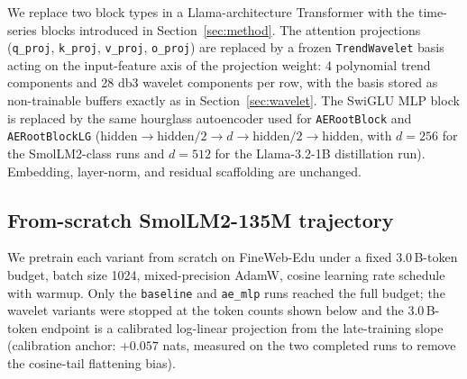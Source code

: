 \documentclass[11pt,a4paper]{article}
\begin{document}
We replace two block types in a Llama-architecture Transformer with the time-series blocks introduced in Section~\ref{sec:method}. The attention projections (\texttt{q\_proj}, \texttt{k\_proj}, \texttt{v\_proj}, \texttt{o\_proj}) are replaced by a frozen \texttt{TrendWavelet} basis acting on the input-feature axis of the projection weight: 4 polynomial trend components and 28 db3 wavelet components per row, with the basis stored as non-trainable buffers exactly as in Section~\ref{sec:wavelet}. The SwiGLU MLP block is replaced by the same hourglass autoencoder used for \texttt{AERootBlock} and \texttt{AERootBlockLG} ($\mathrm{hidden} \to \mathrm{hidden}/2 \to d \to \mathrm{hidden}/2 \to \mathrm{hidden}$, with $d=256$ for the SmolLM2-class runs and $d=512$ for the Llama-3.2-1B distillation run). Embedding, layer-norm, and residual scaffolding are unchanged.

\begin{table}[h]
  \caption{Parameter counts for the SmolLM2-135M-class port. The MLP block accounts for 59\% of the baseline parameter count and is the primary compression target. Total compression of the variants is roughly proportional to MLP-block compression.}
  \label{tab:llm_params}
  \centering
\end{table}

\subsection{From-scratch SmolLM2-135M trajectory}

We pretrain each variant from scratch on FineWeb-Edu under a fixed 3.0\,B-token budget, batch size 1024, mixed-precision AdamW, cosine learning rate schedule with warmup. Only the \texttt{baseline} and \texttt{ae\_mlp} runs reached the full budget; the wavelet variants were stopped at the token counts shown below and the 3.0\,B-token endpoint is a calibrated log-linear projection from the late-training slope (calibration anchor: $+0.057$ nats, measured on the two completed runs to remove the cosine-tail flattening bias).
\end{document}
